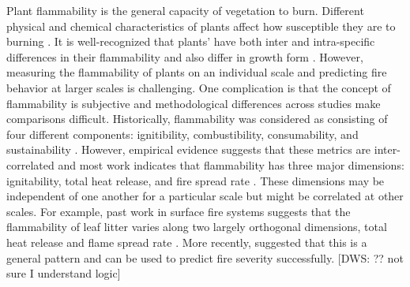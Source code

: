 \documentclass[12pt]{report}
\begin{document}
Plant flammability is the general capacity of vegetation to burn. Different physical and chemical characteristics of plants affect how susceptible they are to burning \citep{bond1996fire}. It is well-recognized that plants' have both inter and intra-specific differences in their flammability \citep{pausas2012fire, battersby2017exploring, cui2020shoot, cui2022intraspecific} and also differ in growth form \citep{calitz2015investigating, jaureguiberry2011device, zanzarini2022flammability, potts2022growth, cui2020shoot, wyse2016quantitative}. However, measuring the flammability of plants on an individual scale and predicting fire behavior at larger scales is challenging. One complication is that the concept of flammability is subjective \citep{gill2005flammability} and methodological differences across studies make comparisons difficult. Historically, flammability was considered as consisting of four different components: ignitibility, combustibility, consumability, and sustainability \citep{anderson1970forest, martin1993assessing}. However, empirical evidence suggests that these metrics are inter-correlated and most work indicates that flammability has three major dimensions: ignitability, total heat release, and fire spread rate \citep{pausas2017flammability}. These dimensions may be independent of one another for a particular scale but might be correlated at other scales. For example, past work in surface fire systems suggests that the flammability of leaf litter varies along two largely orthogonal dimensions, total heat release and flame spread rate \citep{de2012leaf}. More recently, \citep{prior2018conceptualizing} suggested that this is a general pattern and can be used to predict fire severity successfully. [DWS: ?? not sure I understand logic]
\end{document}
